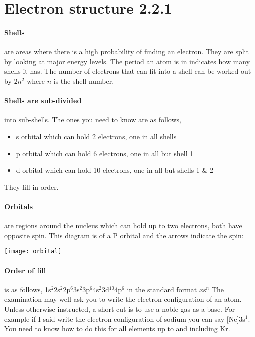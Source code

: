    \section{Electron structure 2.2.1}

	\paragraph{Shells} are areas where there is a high probability of finding an electron.
	They are split by looking at major energy levels.
	The period an atom is in indicates how many shells it has.
	The number of electrons that can fit into a shell can be worked out by $2n^2$ where $n$ is the shell number.
	
	\paragraph{Shells are sub-divided} into sub-shells. The ones you need to know are as follows,
	\begin{itemize}
		\item s orbital which can hold 2 electrons, one in all shells
		\item p orbital which can hold 6 electrons, one in all but shell 1
		\item d orbital which can hold 10 electrons, one in all but shells 1 \& 2
	\end{itemize}
	They fill in order.
	
	\paragraph{Orbitals} are regions around the nucleus which can hold up to two electrons, both have opposite spin.
	This diagram is of a P orbital and the arrows indicate the spin:
    \begin{center}
    \texttt{[image: orbital]}
    \end{center}
    \paragraph{Order of fill} is as follows, 1s$^2$2s$^2$2p$^6$3s$^2$3p$^6$4s$^2$3d$^{10}$4p$^6$ in the standard format $x$s$^n$
    The examination may well ask you to write the electron configuration of an atom.
	Unless otherwise instructed, a short cut is to use a noble gas as a base.
	For example if I said write the electron configuration of sodium you can say [Ne]3s$^1$.
	You need to know how to do this for all elements up to and including Kr.
